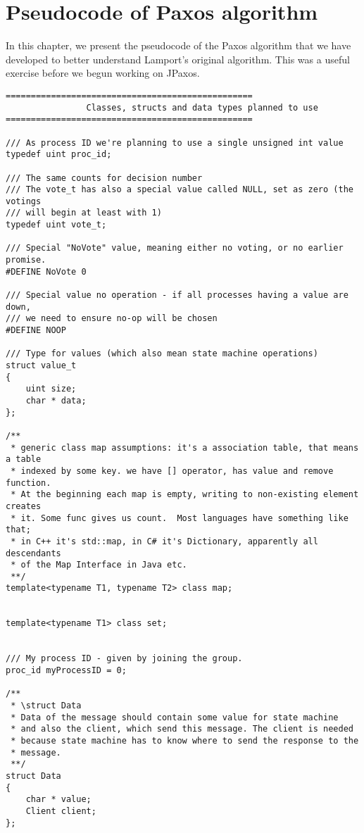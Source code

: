 \chapter{Pseudocode of Paxos algorithm}

In this chapter, we present the pseudocode of the Paxos algorithm that
we have developed to better understand Lamport's original algorithm.
This was a useful exercise before we begun working on JPaxos.

{
\lstset{basicstyle=\tiny\ttfamily}

\begin{lstlisting}[frame=lines,caption=Pseudocode of Paxos algorithm]
=================================================
                Classes, structs and data types planned to use
=================================================

/// As process ID we're planning to use a single unsigned int value
typedef uint proc_id;

/// The same counts for decision number
/// The vote_t has also a special value called NULL, set as zero (the votings
/// will begin at least with 1)
typedef uint vote_t;

/// Special "NoVote" value, meaning either no voting, or no earlier promise.
#DEFINE NoVote 0

/// Special value no operation - if all processes having a value are down,
/// we need to ensure no-op will be chosen
#DEFINE NOOP

/// Type for values (which also mean state machine operations)
struct value_t
{
	uint size;
	char * data;
};

/**
 * generic class map assumptions: it's a association table, that means a table
 * indexed by some key. we have [] operator, has value and remove function.
 * At the beginning each map is empty, writing to non-existing element creates
 * it. Some func gives us count.  Most languages have something like that;
 * in C++ it's std::map, in C# it's Dictionary, apparently all descendants
 * of the Map Interface in Java etc.
 **/
template<typename T1, typename T2> class map;


template<typename T1> class set;


/// My process ID - given by joining the group.
proc_id myProcessID = 0;

/**
 * \struct Data
 * Data of the message should contain some value for state machine 
 * and also the client, which send this message. The client is needed
 * because state machine has to know where to send the response to the 
 * message.
 **/
struct Data
{
	char * value;
	Client client;
};


\end{lstlisting}}
